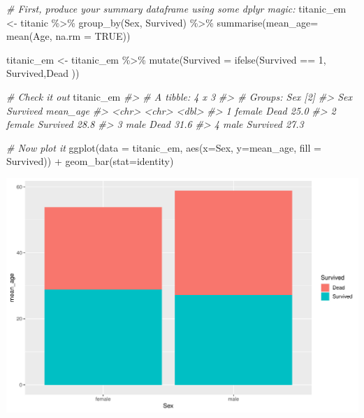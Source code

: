 \documentclass[
]{book}
\newenvironment{Shaded}{\begin{snugshade}}{\end{snugshade}}
\newcommand{\AttributeTok}[1]{\textcolor[rgb]{0.77,0.63,0.00}{#1}}
\newcommand{\CommentTok}[1]{\textcolor[rgb]{0.56,0.35,0.01}{\textit{#1}}}
\newcommand{\ConstantTok}[1]{\textcolor[rgb]{0.00,0.00,0.00}{#1}}
\newcommand{\DecValTok}[1]{\textcolor[rgb]{0.00,0.00,0.81}{#1}}
\newcommand{\FunctionTok}[1]{\textcolor[rgb]{0.00,0.00,0.00}{#1}}
\newcommand{\NormalTok}[1]{#1}
\newcommand{\OtherTok}[1]{\textcolor[rgb]{0.56,0.35,0.01}{#1}}
\newcommand{\SpecialCharTok}[1]{\textcolor[rgb]{0.00,0.00,0.00}{#1}}
\newcommand{\StringTok}[1]{\textcolor[rgb]{0.31,0.60,0.02}{#1}}
\begin{document}
\begin{Shaded}
\begin{Highlighting}[]
\CommentTok{\# First, produce your summary dataframe using some dplyr magic:}
\NormalTok{titanic\_em }\OtherTok{\textless{}{-}}\NormalTok{ titanic }\SpecialCharTok{\%\textgreater{}\%} 
  \FunctionTok{group\_by}\NormalTok{(Sex, Survived) }\SpecialCharTok{\%\textgreater{}\%} 
  \FunctionTok{summarise}\NormalTok{(}\AttributeTok{mean\_age=} \FunctionTok{mean}\NormalTok{(Age, }\AttributeTok{na.rm =} \ConstantTok{TRUE}\NormalTok{))}

\NormalTok{titanic\_em }\OtherTok{\textless{}{-}}\NormalTok{ titanic\_em }\SpecialCharTok{\%\textgreater{}\%} 
  \FunctionTok{mutate}\NormalTok{(}\AttributeTok{Survived =} \FunctionTok{ifelse}\NormalTok{(Survived }\SpecialCharTok{==} \DecValTok{1}\NormalTok{, }\StringTok{\textquotesingle{}Survived\textquotesingle{}}\NormalTok{,}\StringTok{\textquotesingle{}Dead\textquotesingle{}}\NormalTok{ ))}

\CommentTok{\# Check it out}
\NormalTok{titanic\_em}
\CommentTok{\#\textgreater{} \# A tibble: 4 x 3}
\CommentTok{\#\textgreater{} \# Groups:   Sex [2]}
\CommentTok{\#\textgreater{}   Sex    Survived mean\_age}
\CommentTok{\#\textgreater{}   \textless{}chr\textgreater{}  \textless{}chr\textgreater{}       \textless{}dbl\textgreater{}}
\CommentTok{\#\textgreater{} 1 female Dead         25.0}
\CommentTok{\#\textgreater{} 2 female Survived     28.8}
\CommentTok{\#\textgreater{} 3 male   Dead         31.6}
\CommentTok{\#\textgreater{} 4 male   Survived     27.3}

\CommentTok{\# Now plot it}
\FunctionTok{ggplot}\NormalTok{(}\AttributeTok{data =}\NormalTok{ titanic\_em, }
       \FunctionTok{aes}\NormalTok{(}\AttributeTok{x=}\NormalTok{Sex, }\AttributeTok{y=}\NormalTok{mean\_age, }\AttributeTok{fill =}\NormalTok{ Survived)) }\SpecialCharTok{+}
  \FunctionTok{geom\_bar}\NormalTok{(}\AttributeTok{stat=}\StringTok{\textquotesingle{}identity\textquotesingle{}}\NormalTok{)}
\end{Highlighting}
\end{Shaded}

\includegraphics[width=694.08px]{figures/unnamed-chunk-169-1}
\end{document}

